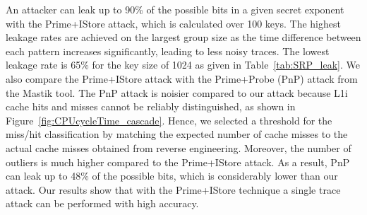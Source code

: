 An attacker can leak up to 90\% of the possible bits in a given secret exponent with the Prime+IStore attack, which is calculated over 100 keys. The highest leakage rates are achieved on the largest group size as the time difference between each pattern increases significantly, leading to less noisy traces. The lowest leakage rate is 65\% for the key size of 1024 as given in Table~\ref{tab:SRP_leak}. We also compare the Prime+IStore attack with the Prime+Probe (PnP) attack from the Mastik tool. The PnP attack is noisier compared to our attack because L1i cache hits and misses cannot be reliably distinguished, as shown in Figure~\ref{fig:CPUcycleTime_cascade}. Hence, we selected a threshold for the miss/hit classification by matching the expected number of cache misses to the actual cache misses obtained from reverse engineering. Moreover, the number of outliers is much higher compared to the Prime+IStore attack. As a result, PnP can leak up to 48\% of the possible bits, which is considerably lower than our attack. Our results show that with the Prime+IStore technique a single trace attack can be performed with high accuracy.

